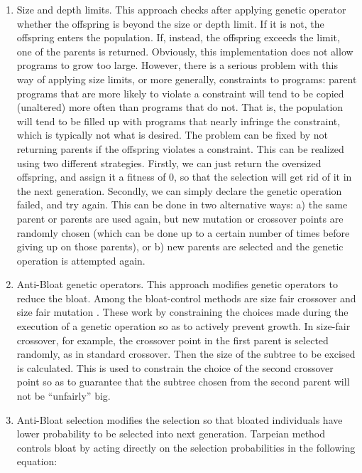  \begin{enumerate}
 	\item Size and depth limits. This approach checks after applying genetic operator whether the offspring is beyond the size or depth limit. If it is not, the offspring enters the population. If, instead, the offspring exceeds the limit, one of the parents is returned. Obviously, this implementation does not allow programs to grow too large. However, there is a serious problem with this way of applying size limits, or more generally, constraints to programs: parent programs that are more likely to violate a constraint will tend to be copied (unaltered) more often than programs that do not. That is, the population will tend to be filled up with programs that nearly infringe the constraint, which is typically not what is desired. The problem can be fixed by not returning parents if the offspring violates a constraint. This can be realized using two different strategies. Firstly, we can just return the oversized offspring, and assign it a fitness of 0, so that the selection will get rid of it in the next generation. Secondly, we can simply declare the genetic operation failed, and try again. This can be done in two alternative ways: a) the same parent or parents are used again, but new mutation or crossover points are randomly chosen (which can be done up to a certain number of times before giving up on those parents), or b) new parents are selected and the genetic operation is attempted again.
 	\item Anti-Bloat genetic operators. This approach modifies genetic operators to reduce the bloat. Among the bloat-control methods are size fair crossover and size fair mutation \cite{langdonSizeFairCrossover}. These work by constraining the choices made during the execution of a genetic operation so as to actively prevent growth. In size-fair crossover, for example, the crossover point in the first parent is selected randomly, as in standard crossover. Then the size of the subtree to be excised is calculated. This is used to constrain the choice of the second crossover point so as to guarantee that the subtree chosen from the second parent will not be “unfairly” big.
 	\item Anti-Bloat selection modifies the selection so that bloated individuals have lower probability to be selected into next generation. Tarpeian method \cite{PoliAntiBloatTheoreticallyMotivated} controls bloat by acting directly on the selection probabilities in the following equation:
 	\begin{equation}

\end{equation}
\end{enumerate}
